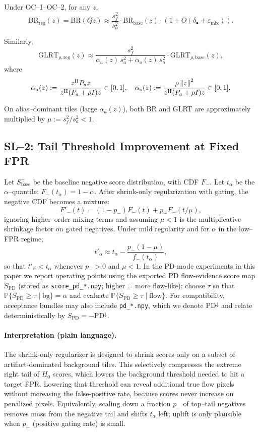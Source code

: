 Under OC--1--OC--2, for any $z$,
\[
\mathrm{BR}_{\text{reg}}(z) = \mathrm{BR}(Qz) 
  \approx \frac{s_f^2}{s_a^2} \cdot \mathrm{BR}_{\text{base}}(z) \cdot (1 + O(\delta_\bullet+\varepsilon_{\text{mix}})).
\]

Similarly,
\[
\mathrm{GLRT}_{\rho,\text{reg}}(z) \approx 
  \frac{s_f^2}{\alpha_a(z)\,s_a^2 + \alpha_o(z)\,s_o^2}\cdot \mathrm{GLRT}_{\rho,\text{base}}(z),
\]
where
\[
\alpha_a(z) := \frac{z^{\mathrm{H}} P_a z}{z^{\mathrm{H}}(P_a+\rho I)z} \in [0,1],\quad
\alpha_o(z) := \frac{\rho\left\lVert z \right\rVert^2}{z^{\mathrm{H}}(P_a+\rho I)z}\in[0,1].
\]

On alias--dominant tiles (large $\alpha_a(z)$), both BR and GLRT are approximately multiplied by $\mu := s_f^2/s_a^2<1$.

\subsection{SL--2: Tail Threshold Improvement at Fixed FPR}

Let $S^-_{\text{base}}$ be the baseline negative score distribution, with CDF $F_-$. Let $t_\alpha$ be the $\alpha$--quantile: $F_-(t_\alpha) = 1-\alpha$. After shrink-only regularization with gating, the negative CDF becomes a mixture:
\[
F'_-(t) = (1-p_-) F_-(t) + p_- F_-(t/\mu),
\]
ignoring higher--order mixing terms and assuming $\mu<1$ is the multiplicative shrinkage factor on gated negatives. Under mild regularity and for $\alpha$ in the low--FPR regime,
\[
t'_\alpha \approx t_\alpha - \frac{p_-(1-\mu)}{f_-(t_\alpha)},
\]
so that $t'_\alpha < t_\alpha$ whenever $p_->0$ and $\mu<1$.
In the PD-mode experiments in this paper we report operating points using the exported PD flow-evidence score map $S_{\mathrm{PD}}$ (stored as \texttt{score\_pd\_*.npy}; higher = more flow-like): choose $\tau$ so that $\mathbb{P}\{S_{\mathrm{PD}}\ge\tau\mid \mathrm{bg}\}=\alpha$ and evaluate $\mathbb{P}\{S_{\mathrm{PD}}\ge\tau\mid \mathrm{flow}\}$. For compatibility, acceptance bundles may also include \texttt{pd\_*.npy}, which we denote $\mathrm{PD}^{\downarrow}$ and relate deterministically by $S_{\mathrm{PD}}=-\mathrm{PD}^{\downarrow}$.

\paragraph{Interpretation (plain language).}
The shrink-only regularizer is designed to shrink scores only on a subset of artifact-dominated background tiles. This selectively compresses the extreme right tail of $H_0$ scores, which lowers the background threshold needed to hit a target FPR. Lowering that threshold can reveal additional true flow pixels without increasing the false-positive rate, because scores never increase on penalized pixels. Equivalently, scaling down a fraction $p_-$ of top--tail negatives removes mass from the negative tail and shifts $t_\alpha$ left; uplift is only plausible when $p_+$ (positive gating rate) is small.

